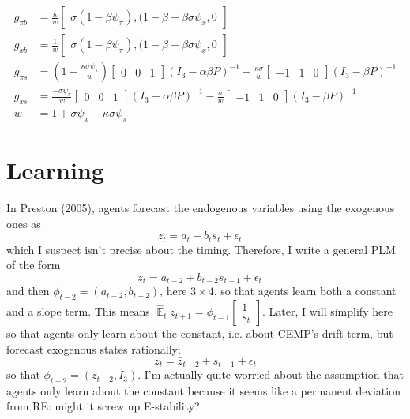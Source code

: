 \documentclass[11pt]{article}
\renewcommand{\[}{\begin{equation}}
\renewcommand{\]}{\end{equation}}
\DeclareMathOperator{\E}{\mathbb{E}}
\begin{document}
\begin{align}
g_{\pi b} & = \frac{\kappa}{w} \begin{bmatrix}\sigma(1-\beta\psi_{\pi}), (1-\beta-\beta\sigma\psi_x, 0 \end{bmatrix}\\
g_{x b} & = \frac{1}{w} \begin{bmatrix}\sigma(1-\beta\psi_{\pi}), (1-\beta-\beta\sigma\psi_x, 0 \end{bmatrix} \\
g_{\pi s} & = (1-\frac{\kappa\sigma\psi_{\pi}}{w} )\begin{bmatrix} 0&0&1 \end{bmatrix} (I_3 - \alpha\beta P)^{-1} -\frac{\kappa\sigma}{w}\begin{bmatrix} -1&1&0 \end{bmatrix} (I_3 -\beta P)^{-1}\\
g_{x s} & =  \frac{-\sigma\psi_{\pi}}{w} \begin{bmatrix} 0&0&1 \end{bmatrix}(I_3 - \alpha\beta P)^{-1}  -\frac{\sigma}{w}\begin{bmatrix} -1&1&0 \end{bmatrix}(I_3 -\beta P)^{-1}\\
w & = 1+\sigma\psi_x +\kappa\sigma\psi_{\pi}
\end{align}
\clearpage

 \section{Learning}

In Preston (2005), agents forecast the endogenous variables using the exogenous ones as
\begin{equation}
z_t = a_{t} + b_{t} s_{t} + \epsilon_t \quad  \tag{Preston, p. 101}
\end{equation}
which I suspect isn't precise about the timing. Therefore, I write a general PLM of the form
\begin{equation}
z_t = a_{t-2} + b_{t-2} s_{t-1} + \epsilon_t \quad  \label{generalPLM}
\end{equation}
and then $\phi_{t-2} = (a_{t-2}, b_{t-2})$, here $3\times4$, so that agents learn both a constant and a slope term. This means $\hat{\E}_t z_{t+1} = \phi_{t-1}\begin{bmatrix} 1 \\ s_{t} \end{bmatrix} $. Later, I will simplify here so that agents only learn about the constant, i.e. about CEMP's drift term, but forecast exogenous states rationally:
\begin{equation}
z_t = \bar{z}_{t-2} + s_{t-1} + \epsilon_t \label{PLM}  
\end{equation}
so that $\phi_{t-2} = (\bar{z}_{t-2}, I_3)$. I'm actually quite worried about the assumption that agents only learn about the constant because it seems like a permanent deviation from RE: might it screw up E-stability? 
\end{document}
